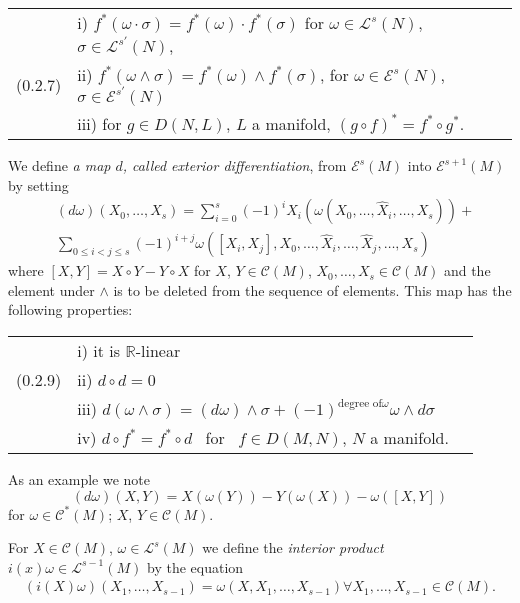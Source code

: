 \smallskip
\noindent
\begin{tabular}{@{}lll}
& {i)} $f^{\ast}(\omega\cdot\sigma)=f^{\ast}(\omega)\cdot
  f^{\ast}(\sigma)$ for $\omega\in \mathscr{L}^{s}(N)$, $\sigma\in
  \mathscr{L}^{s'}(N)$, \\
(0.2.7)\label{chap0:0.2.7} & {ii)}
  $f^{\ast}(\omega\wedge\sigma)=f^{\ast}(\omega)\wedge 
  f^{\ast}(\sigma)$, for $\omega\in \mathscr{E}^{s}(N)$,
  $\sigma\in\mathscr{E}^{s'}(N)$ \\
& {iii)} for $g\in D(N,L)$, $L$ a manifold, $(g\circ
  f)^{\ast}=f^{\ast}\circ g^{\ast}$.
\end{tabular}

We define {\em a map $d$, called exterior differentiation}, from
$\mathscr{E}^{s}(M)$ into $\mathscr{E}^{s+1}(M)$ by setting
\begin{align*}\label{chap0:0.2.8}
&
  (d\omega)(X_{0},\ldots,X_{s})=\sum^{s}_{i=0}(-1)^{i}X_{i}(\omega(X_{0},\ldots,\widehat{X}_{i},\ldots,X_{s}))+\tag{0.2.8}\\
& \sum_{0\leq i<j\leq
  s}(-1)^{i+j}\omega([X_{i},X_{j}],X_{0},\ldots,\widehat{X}_{i},\ldots,\widehat{X}_{j},\ldots,X_{s}) 
\end{align*}
where $[X,Y]=X\circ Y-Y\circ X$ for $X$, $Y\in \mathscr{C}(M)$,
$X_{0},\ldots,X_{s}\in \mathscr{C}(M)$ and the element under $\wedge$
is to be deleted from the sequence of elements. This map has the
following properties:

\smallskip
\noindent
\begin{tabular}{lll}
& {i)} it is $\mathbb{R}$-linear\\
(0.2.9)\label{chap0:0.2.9} & {ii)} $d\circ d=0$\\
&  {iii)} $d(\omega\wedge\sigma) =
(d\omega) \wedge \sigma+(-1)^{\text{degree of}\omega} \omega \wedge
d\sigma$\\
& {iv)} $d\circ f^{\ast}=f^{\ast}\circ d$ \ for \ $f\in D(M,N)$, 
  $N$ a manifold.
  \end{tabular}

As an example we note
\begin{equation*}\label{chap0:0.2.10}
(d\omega)(X,Y)=X(\omega(Y))-Y(\omega(X))-\omega([X,Y])\tag{0.2.10}
\end{equation*}
for $\omega\in\mathscr{C}^{\ast}(M)$; $X$, $Y\in\mathscr{C}(M)$.

For $X\in\mathscr{C}(M)$, $\omega\in\mathscr{L}^{s}(M)$ we define the
{\em interior product} $i(x)\omega\in \mathscr{L}^{s-1}(M)$ by the
equation
\begin{align*}\label{chap0:0.2.11}
 (i(X)\omega)(X_{1}, \ldots, X_{s-1}) = \omega(X,X_{1}, \ldots,
  X_{s-1})
 \forall X_{1},\ldots,X_{s-1}\in\mathscr{C}(M). \tag{0.2.11}
\end{align*}

